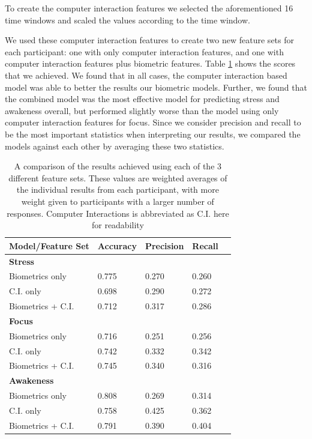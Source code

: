To create the computer interaction features we selected the aforementioned
16 time windows and scaled the values according to the time window. 

We used these computer interaction features to create two new feature sets for each participant: one with only computer interaction features, and one with computer interaction features plus biometric features. Table \ref{ciPerformance} shows the scores that we achieved. We found that in all cases, the computer interaction based model was able to better the results our biometric models. Further, we found that the combined model was the most effective model for predicting stress and awakeness overall, but performed slightly worse than the model using only computer interaction features for focus. Since we consider precision and recall to be the most important statistics when interpreting our results, we compared the models against each other by averaging these two statistics.


\begin{table}
\begin{center}
\begin{tabular}{lllll}
\hline
Model/Feature Set & Accuracy & Precision & Recall\\
\hline
\textbf{Stress}\\
\hspace{3mm}Biometrics only & 0.775 & 0.270 &	0.260\\
\hspace{3mm}C.I. only & 0.698 & 0.290 & 0.272\\
\hspace{3mm}Biometrics + C.I. & 0.712 & 0.317 & 0.286\\
\hline
\textbf{Focus}\\
\hspace{3mm}Biometrics only & 0.716 & 0.251 & 0.256\\
\hspace{3mm}C.I. only & 0.742 & 0.332 & 0.342\\
\hspace{3mm}Biometrics + C.I. & 0.745 & 0.340 & 0.316\\
\hline
\textbf{Awakeness}\\
\hspace{3mm}Biometrics only & 0.808 & 0.269 & 0.314\\
\hspace{3mm}C.I. only & 0.758 & 0.425 & 0.362\\
\hspace{3mm}Biometrics + C.I. & 0.791 & 0.390 & 0.404\\
\hline
\end{tabular}
\caption{A comparison of the results achieved using each of the 3 different feature sets. These values are weighted averages of the individual results from each participant, with more weight given to participants with a larger number of responses. Computer Interactions is abbreviated as C.I. here for readability}
\label{ciPerformance}
\end{center}
\end{table}

